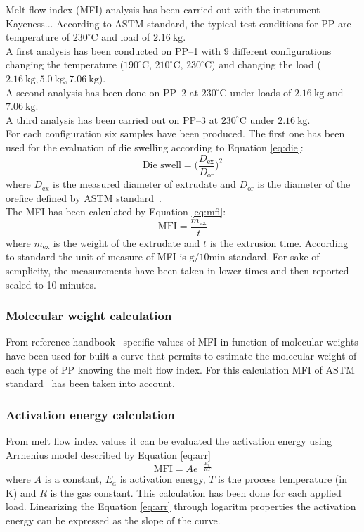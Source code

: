 \documentclass[a4paper, 11pt]{article}
\begin{document}
Melt flow index (MFI) analysis has been carried out with the instrument Kayeness... According to ASTM standard, the typical test conditions for PP are temperature of $230 ^\circ$C and load of $2.16\  \text{kg}$. \\
A first analysis has been conducted on PP–1 with 9 different configurations changing the temperature ($190 ^\circ$C, $210 ^\circ$C, $230 ^\circ$C) and changing the load ($2.16\ \text{kg}, 5.0\ \text{kg}, 7.06 \ \text{kg}$). \\
A second analysis has been done on PP–2 at $230 ^\circ$C under loads of  $2.16\ \text{kg}$ and  $7.06\ \text{kg}$. \\
A third analysis has been carried out on PP–3 at $230 ^\circ$C under $2.16\ \text{kg}$. \\
For each configuration six samples have been produced. The first one has been used for the evaluation of die swelling according to Equation \ref{eq:die}:
\begin{equation}
\text{Die\ swell} = \bigg(\frac{D_\text{ex}}{D_\text{or}}\bigg)^2
\label{eq:die}
\end{equation}
where $D_\text{ex}$ is the measured diameter of extrudate and $D_\text{or}$ is the diameter of the orefice defined by ASTM standard~\cite{MFI}. \\
The MFI has been calculated by Equation \ref{eq:mfi}: 
\begin{equation}
\text{MFI} = \frac{m_\text{ex}}{t}
\label{eq:mfi}
\end{equation}
where $m_\text{ex}$ is the weight of the extrudate and $t$ is the extrusion time. According to standard the unit of measure of MFI is $\text{g/10min}$ standard. For sake of semplicity, the measurements have been taken in lower times and then reported scaled to 10 minutes. 

\subsubsection{Molecular weight calculation}
From reference handbook~\cite{handbook} specific values of MFI in function of molecular weights have been used for built a curve that permits to estimate the molecular weight of each type of PP knowing the melt flow index. For this calculation MFI of ASTM standard~\cite{MFI} has been taken into account.

\subsubsection{Activation energy calculation}
From melt flow index values it can be evaluated the activation energy using Arrhenius model described by Equation \ref{eq:arr}
\begin{equation}
\text{MFI} = A e ^{-\frac{E_a}{RT}}
\label{eq:arr}
\end{equation}
where $A$ is a constant, $E_a$ is activation energy, $T$ is the process temperature  (in K) and $R$ is the gas constant. This calculation has been done for each applied load. Linearizing the Equation \ref{eq:arr} through logaritm properties the activation energy can be expressed as the slope of the curve.
\end{document}
